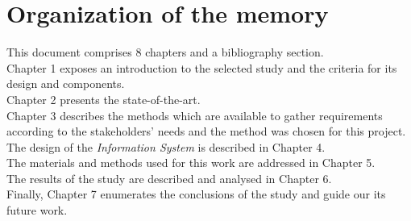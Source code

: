 





\section{Organization of the memory}

This document comprises 8 chapters and a bibliography section.\\

Chapter 1 exposes an introduction to the selected study and the criteria for its design and components.\\

Chapter 2 presents the state-of-the-art.\\

Chapter 3 describes the methods which are available to gather requirements according to the stakeholders' needs and the method was chosen for this project.\\

The design of the \textit{Information System} \cite{information_system, information_system_architecture} is described in Chapter 4.\\

The materials and methods used for this work are addressed in Chapter 5.\\

The results of the study are described and analysed in Chapter 6.\\

Finally, Chapter 7 enumerates the conclusions of the study and guide our its future work.\\

\newpage
\newpage
